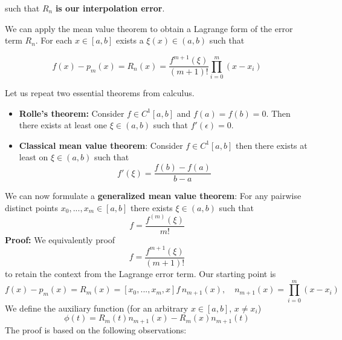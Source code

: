 such that $R_n$ \textbf{is our interpolation error}.

We can apply the mean value theorem to obtain a Lagrange form of the error term $R_n$.
For each $x \in [a,b]$ exists a $\xi(x) \in (a,b)$ such that

\begin{equation}
    \boxed{f(x) - p_m(x) = R_n(x) = \frac{f^{m+1}(\xi)}{(m+1)!} \prod_{i = 0}^{m} (x - x_i)}
\end{equation}


Let us repeat two essential theorems from calculus.
\begin{itemize}
    \item \textbf{Rolle's theorem:} Consider $f \in C^1[a,b]$ and $f(a) = f(b) = 0$. Then there
exists at least one $\xi \in (a,b)$ such that $f'(\epsilon) = 0$.
    \item \textbf{Classical mean value theorem}: Consider $f \in C^1[a,b]$ then there exists at least on $\xi \in (a,b)$ such that
\begin{equation}
    f'(\xi) = \frac{f(b) - f(a)}{b - a}
\end{equation}
\end{itemize}
We can now formulate a \textbf{generalized mean value theorem}:
For any pairwise distinct points $x_0,...,x_m \in [a,b]$ there exists $\xi \in (a,b)$ such that
\begin{equation}
    [x_0,...,x_m] f = \frac{f^{(m)}(\xi)}{m!}
\end{equation}
\textbf{Proof:} We equivalently proof
\begin{equation}
    [x_0,...,x_m,x] f = \frac{f^{m+1}(\xi)}{(m+1)!}
\end{equation}
to retain the context from the Lagrange error term. Our starting point is
\begin{equation}
    f(x) - p_m(x) = R_m(x) = [x_0,...,x_m,x] f \, n_{m+1}(x), \quad n_{m+1}(x) = \prod_{i = 0}^{m} (x - x_i)
\end{equation}
We define the auxiliary function (for an arbitrary $x \in [a,b]$, $x \neq x_i$)
\begin{equation}
    \phi(t) = R_m(t) n_{m+1}(x) - R_m(x) n_{m+1}(t)
\end{equation}
The proof is based on the following observations:

